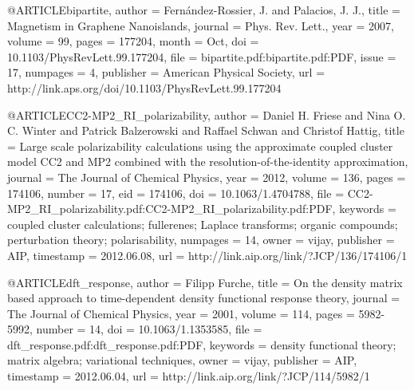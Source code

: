 @ARTICLE{bipartite,
  author = {Fern\'andez-Rossier, J. and Palacios, J. J.},
  title = {Magnetism in Graphene Nanoislands},
  journal = {Phys. Rev. Lett.},
  year = {2007},
  volume = {99},
  pages = {177204},
  month = {Oct},
  doi = {10.1103/PhysRevLett.99.177204},
  file = {bipartite.pdf:bipartite.pdf:PDF},
  issue = {17},
  numpages = {4},
  publisher = {American Physical Society},
  url = {http://link.aps.org/doi/10.1103/PhysRevLett.99.177204}
}

@ARTICLE{CC2-MP2_RI_polarizability,
  author = {Daniel H. Friese and Nina O. C. Winter and Patrick Balzerowski and
	Raffael Schwan and Christof Hattig},
  title = {Large scale polarizability calculations using the approximate coupled
	cluster model CC2 and MP2 combined with the resolution-of-the-identity
	approximation},
  journal = {The Journal of Chemical Physics},
  year = {2012},
  volume = {136},
  pages = {174106},
  number = {17},
  eid = {174106},
  doi = {10.1063/1.4704788},
  file = {CC2-MP2_RI_polarizability.pdf:CC2-MP2_RI_polarizability.pdf:PDF},
  keywords = {coupled cluster calculations; fullerenes; Laplace transforms; organic
	compounds; perturbation theory; polarisability},
  numpages = {14},
  owner = {vijay},
  publisher = {AIP},
  timestamp = {2012.06.08},
  url = {http://link.aip.org/link/?JCP/136/174106/1}
}

@ARTICLE{dft_response,
  author = {Filipp Furche},
  title = {On the density matrix based approach to time-dependent density functional
	response theory},
  journal = {The Journal of Chemical Physics},
  year = {2001},
  volume = {114},
  pages = {5982-5992},
  number = {14},
  doi = {10.1063/1.1353585},
  file = {dft_response.pdf:dft_response.pdf:PDF},
  keywords = {density functional theory; matrix algebra; variational techniques},
  owner = {vijay},
  publisher = {AIP},
  timestamp = {2012.06.04},
  url = {http://link.aip.org/link/?JCP/114/5982/1}
}

